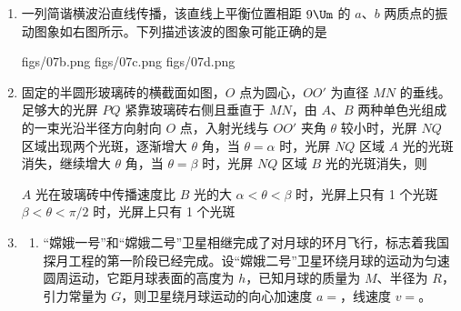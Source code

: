 \documentclass[\gkver]{gaokaozhenti}
\begin{document}
\begin{enumerate}

{$q$ 由 $A$ 向 $O$ 运动的过程电势能逐渐减小}
{$q$ 运动到 $O$ 点时的动能最大}
{$q$ 运动到 $O$ 点时电势能为零}


\item
一列简谐横波沿直线传播，该直线上平衡位置相距 $9\Um$ 的 $a$、$b$ 两质点的振动图象如右图所示。下列描述该波的图象可能正确的是


{figs/07b.png}
{figs/07c.png}
{figs/07d.png}


\item
固定的半圆形玻璃砖的横截面如图，$O$ 点为圆心，$OO'$ 为直径 $MN$ 的垂线。足够大的光屏 $PQ$ 紧靠玻璃砖右侧且垂直于 $MN$，由 $A$、$B$ 两种单色光组成的一束光沿半径方向射向 $O$ 点，入射光线与 $OO'$ 夹角 $\theta$ 较小时，光屏 $NQ$ 区域出现两个光斑，逐渐增大 $\theta$ 角，当 $\theta=\alpha$ 时，光屏 $NQ$ 区域 $A$ 光的光斑消失，继续增大 $\theta$ 角，当 $\theta=\beta$ 时，光屏 $NQ$ 区域 $B$ 光的光斑消失，则


{$A$ 光在玻璃砖中传播速度比 $B$ 光的大}
{$\alpha<\theta<\beta$ 时，光屏上只有 1 个光斑}
{$\beta<\theta<\pi/2$ 时，光屏上只有 1 个光斑}


\item
\begin{enumerate}
	\item
	“嫦娥一号”和“嫦娥二号”卫星相继完成了对月球的环月飞行，标志着我国探月工程的第一阶段已经完成。设“嫦娥二号”卫星环绕月球的运动为匀速圆周运动，它距月球表面的高度为 $h$，已知月球的质量为 $M$、半径为 $R$，引力常量为 $G$，则卫星绕月球运动的向心加速度 $a=$，线速度 $v=$。


\end{enumerate}
\end{enumerate}
\end{document}
